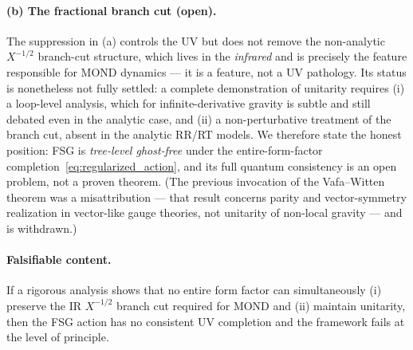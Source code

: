 \documentclass[11pt,a4paper]{article}
\begin{document}
\begin{onehalfspacing}
\paragraph{(b) The fractional branch cut (open).}
The suppression in (a) controls the UV but does not remove the non-analytic $X^{-1/2}$ branch-cut structure, which lives in the \emph{infrared} and is precisely the feature responsible for MOND dynamics --- it is a feature, not a UV pathology. Its status is nonetheless not fully settled: a complete demonstration of unitarity requires (i) a loop-level analysis, which for infinite-derivative gravity is subtle and still debated even in the analytic case, and (ii) a non-perturbative treatment of the branch cut, absent in the analytic RR/RT models. We therefore state the honest position: FSG is \emph{tree-level ghost-free} under the entire-form-factor completion~\eqref{eq:regularized_action}, and its full quantum consistency is an open problem, not a proven theorem. (The previous invocation of the Vafa--Witten theorem was a misattribution --- that result concerns parity and vector-symmetry realization in vector-like gauge theories, not unitarity of non-local gravity --- and is withdrawn.)
\paragraph{Falsifiable content.} If a rigorous analysis shows that no entire form factor can simultaneously (i) preserve the IR $X^{-1/2}$ branch cut required for MOND and (ii) maintain unitarity, then the FSG action has no consistent UV completion and the framework fails at the level of principle.

\end{onehalfspacing}
\end{document}
